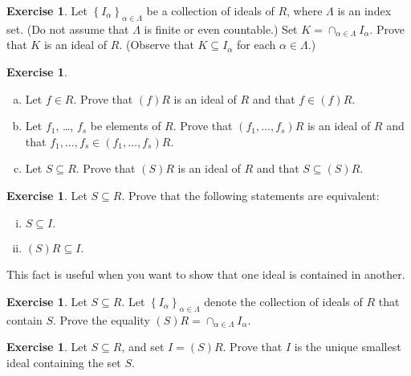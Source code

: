 \documentclass{amsart}
\theoremstyle{plain}
\theoremstyle{definition}
\newtheorem{exercise}[theorem]{Exercise}
\theoremstyle{definition}
\newcommand{\sse}{\subseteq}
\begin{document}
\begin{exercise}
Let $\left\{ I_{\alpha}
\right\}_{\alpha \in \Lambda}$ be a collection of ideals of $R$, where $\Lambda$ is
an index set. (Do not assume that $\Lambda$ is finite or even countable.)  Set $K =
\cap_{\alpha \in \Lambda} I_{\alpha}$.  Prove that $K$ is an ideal of $R$.
(Observe  that $K\sse I_{\alpha}$ for each $\alpha\in \Lambda$.)
\end{exercise}

\begin{exercise}
\begin{enumerate}[a.]
\item Let $f \in R$.  Prove that $(f)R$ is an ideal of $R$ and that $f\in (f)R$.
\item Let $f_{1}$, \ldots, $f_{s}$ be elements of $R$.  Prove that $(f_{1},
\ldots, f_{s})R$ is an ideal of $R$ and that $f_1,\ldots,f_s\in (f_{1},
\ldots, f_{s})R$.
\item Let $S \sse R$.  Prove that $(S)R$ is an ideal of $R$ and that $S\sse (S)R$.
\end{enumerate}
\end{exercise}

\begin{exercise}\label{Exercise:IdealContainment}
Let $S \sse R$.  Prove that the following statements are equivalent:
\begin{enumerate}[(i)]
\item $S \sse I.$
\item $(S)R \sse I$.
\end{enumerate}
This fact is useful when you want to show that one ideal is contained in another.
\end{exercise}

\begin{exercise}
Let $S \sse R$. Let $\left\{
I_{\alpha} \right\}_{\alpha \in \Lambda}$ denote the collection of ideals of $R$ that
contain $S$.  Prove the equality $(S)R = \cap_{\alpha \in \Lambda} I_{\alpha}$.
\end{exercise}

\begin{exercise}
Let $S \sse R$, and set $I = (S)R$.
Prove that $I$ is the unique smallest ideal containing the set $S$.
\end{exercise}
\end{document}
